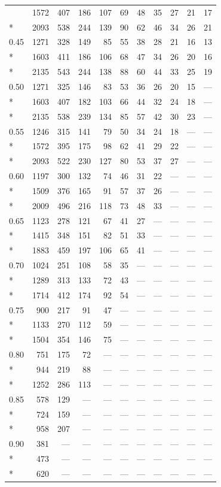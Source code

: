{\begin{longtable}{lrrrrrrrrrr}
 & 1572 & 407 & 186 & 107 & 69 & 48 & 35 & 27 & 21 & 17\\*
 & 2093 & 538 & 244 & 139 & 90 & 62 & 46 & 34 & 26 & 21\\\midrule
0.45 & 1271 & 328 & 149 & 85 & 55 & 38 & 28 & 21 & 16 & 13\\*
 & 1603 & 411 & 186 & 106 & 68 & 47 & 34 & 26 & 20 & 16\\*
 & 2135 & 543 & 244 & 138 & 88 & 60 & 44 & 33 & 25 & 19\\\midrule
0.50 & 1271 & 325 & 146 & 83 & 53 & 36 & 26 & 20 & 15 & —\\*
 & 1603 & 407 & 182 & 103 & 66 & 44 & 32 & 24 & 18 & —\\*
 & 2135 & 538 & 239 & 134 & 85 & 57 & 42 & 30 & 23 & —\\\midrule
0.55 & 1246 & 315 & 141 & 79 & 50 & 34 & 24 & 18 & — & —\\*
 & 1572 & 395 & 175 & 98 & 62 & 41 & 29 & 22 & — & —\\*
 & 2093 & 522 & 230 & 127 & 80 & 53 & 37 & 27 & — & —\\\midrule
0.60 & 1197 & 300 & 132 & 74 & 46 & 31 & 22 & — & — & —\\*
 & 1509 & 376 & 165 & 91 & 57 & 37 & 26 & — & — & —\\*
 & 2009 & 496 & 216 & 118 & 73 & 48 & 33 & — & — & —\\\midrule
0.65 & 1123 & 278 & 121 & 67 & 41 & 27 & — & — & — & —\\*
 & 1415 & 348 & 151 & 82 & 51 & 33 & — & — & — & —\\*
 & 1883 & 459 & 197 & 106 & 65 & 41 & — & — & — & —\\\midrule
0.70 & 1024 & 251 & 108 & 58 & 35 & — & — & — & — & —\\*
 & 1289 & 313 & 133 & 72 & 43 & — & — & — & — & —\\*
 & 1714 & 412 & 174 & 92 & 54 & — & — & — & — & —\\\midrule
0.75 & 900 & 217 & 91 & 47 & — & — & — & — & — & —\\*
 & 1133 & 270 & 112 & 59 & — & — & — & — & — & —\\*
 & 1504 & 354 & 146 & 75 & — & — & — & — & — & —\\\midrule
0.80 & 751 & 175 & 72 & — & — & — & — & — & — & —\\*
 & 944 & 219 & 88 & — & — & — & — & — & — & —\\*
 & 1252 & 286 & 113 & — & — & — & — & — & — & —\\\midrule
0.85 & 578 & 129 & — & — & — & — & — & — & — & —\\*
 & 724 & 159 & — & — & — & — & — & — & — & —\\*
 & 958 & 207 & — & — & — & — & — & — & — & —\\\midrule
0.90 & 381 & — & — & — & — & — & — & — & — & —\\*
 & 473 & — & — & — & — & — & — & — & — & —\\*
 & 620 & — & — & — & — & — & — & — & — & —\\\midrule
\end{longtable}}
